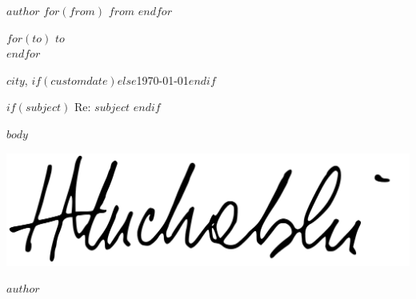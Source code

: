 \documentclass[$fontsize$, a4paper]{article}
\begin{document}

\small
\textsc{\textbf{$author$}}
$for(from)$
\textbullet{} \textsc{$from$}
$endfor$

\vspace{2em}

\normalsize \rmfamily
$for(to)$
$to$\\
$endfor$

\vspace{2em}

\rmfamily
\begin{flushright}
  $city$, $if(customdate)$$else$\today$endif$
\end{flushright}

\vspace{1em}

$if(subject)$
Re: \textbf{$subject$}
$endif$

\vspace{1em}

$body$

\begin{FlushLeft}
  {
    \includegraphics[height=3\baselineskip]{signature.pdf} \par
  }
  {
    \vspace{3.5\baselineskip}
  }
  $author$
\end{FlushLeft}
\end{document}
